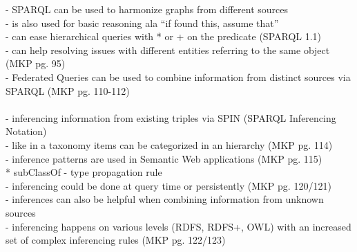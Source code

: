 - SPARQL can be used to harmonize graphs from different sources \\
- is also used for basic reasoning ala ``if found this, assume that'' \\
- can ease hierarchical queries with * or + on the predicate (SPARQL 1.1) \\
- can help resolving issues with different entities referring to the same object (MKP pg. 95)\\
- Federated Queries can be used to combine information from distinct sources via SPARQL (MKP pg. 110-112)\\
\\
- inferencing information from existing triples via SPIN (SPARQL Inferencing Notation) \\
- like in a taxonomy items can be categorized in an hierarchy (MKP pg. 114) \\
- inference patterns are used in Semantic Web applications (MKP pg. 115) \\
   * subClassOf - type propagation rule \\
- inferencing could be done at query time or persistently (MKP pg. 120/121) \\
- inferences can also be helpful when combining information from unknown sources \\
- inferencing happens on various levels (RDFS, RDFS+, OWL) with an increased set of complex inferencing rules (MKP pg. 122/123)
\\

